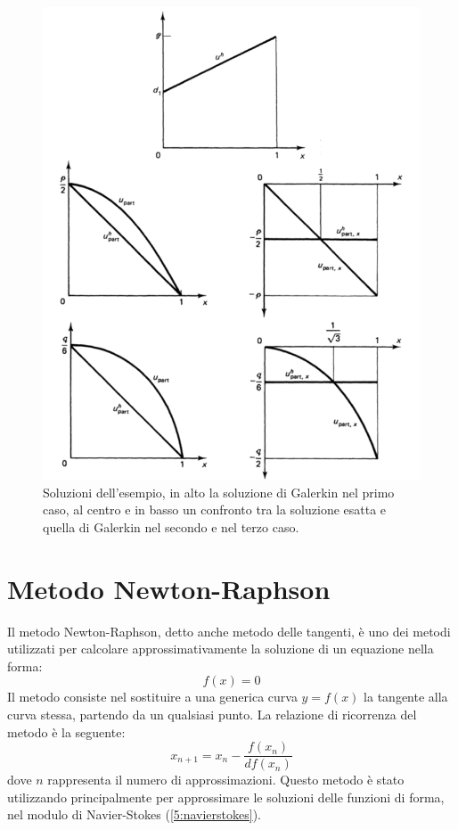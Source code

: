         \begin{figure}[H]
            \centering
            \includegraphics[width=\linewidth]{figure/galerkin.png}
            \caption{Soluzioni dell'esempio, in alto la soluzione di Galerkin nel primo caso, al
            centro e in basso un confronto tra la soluzione esatta e quella di Galerkin nel secondo e
            nel terzo caso. \cite{HughesThomasJ.R2000Tfem}}
        \end{figure}
\section{Metodo Newton-Raphson}\label{newtonraphson}
Il metodo Newton-Raphson, detto anche metodo delle tangenti, è uno dei metodi utilizzati per calcolare approssimativamente la soluzione di un equazione nella forma:
\begin{equation}
    f(x) = 0
\end{equation}
Il metodo consiste nel sostituire a una generica curva \(y = f(x)\) la tangente alla curva stessa, partendo da un qualsiasi punto.
La relazione di ricorrenza del metodo è la seguente:
\begin{equation}
    x_{n+1} = x_n - \frac{f(x_n)}{df(x_n)}
\end{equation}
dove \(n\) rappresenta il numero di approssimazioni.
Questo metodo è stato utilizzando principalmente per approssimare le soluzioni delle funzioni di forma, nel modulo di Navier-Stokes (\ref{5:navierstokes}).